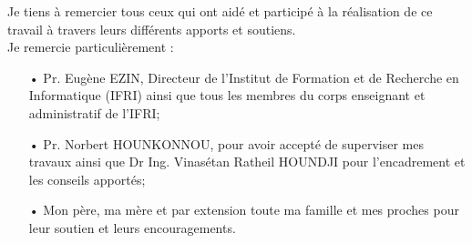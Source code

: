 \remerciements


     Je tiens à remercier tous ceux qui ont aidé et participé à la réalisation de ce travail à travers leurs différents apports et soutiens. \\
	\hspace*{.5cm}Je remercie particulièrement : \\
	\begin{itemize}
		\item[•] Pr. Eugène EZIN, Directeur de l'Institut de Formation et de Recherche en Informatique (IFRI) ainsi que tous les membres du corps enseignant et administratif de l'IFRI;
		\item[•] Pr. Norbert HOUNKONNOU, pour avoir accepté de superviser mes travaux ainsi que Dr Ing. Vinasétan Ratheil HOUNDJI pour l'encadrement et les conseils apportés;
		\item[•] Mon père, ma mère et par extension toute ma famille et mes proches pour leur soutien et leurs encouragements. 
	\end{itemize}

